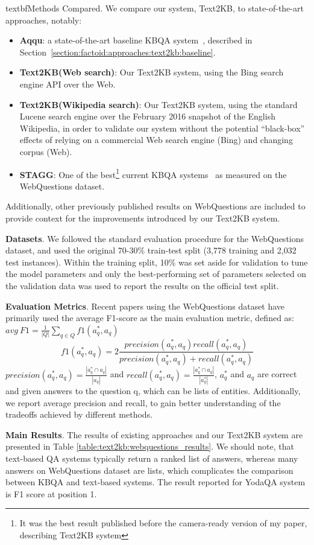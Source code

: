 textbf{Methods Compared}.
We compare our system, Text2KB, to state-of-the-art approaches, notably:
\begin{itemize}
\item{\textbf{Aqqu}}: a state-of-the-art baseline KBQA system~\cite{bastmore:cikm:2015:aquu}, described in Section~\ref{section:factoid:approaches:text2kb:baseline}.
\item{\textbf{Text2KB(Web search)}}: Our Text2KB system, using the Bing search engine API over the Web. 
\item{\textbf{Text2KB(Wikipedia search)}}: Our Text2KB system, using the standard Lucene search engine over the February 2016 snapshot of the English Wikipedia, in order to validate our system without the potential ``black-box'' effects of relying on a commercial Web search engine (Bing) and changing corpus (Web).
\item{\textbf{STAGG}}: One of the best\footnote{It was the best result published before the camera-ready version of my paper, describing Text2KB system} current KBQA systems~\cite{yih:ACL:2015:STAGG} as measured on the WebQuestions dataset.
\end{itemize}
Additionally, other previously published results on WebQuestions are included to provide context for the improvements introduced by our Text2KB system.

\textbf{Datasets}.
We followed the standard evaluation procedure for the WebQuestions dataset, and used the original 70-30\% train-test split (3,778 training and 2,032 test instances). Within the training split, 10\% was set aside for validation to tune the model parameters and only the best-performing set of parameters selected on the validation data was used to report the results on the official test split.

\textbf{Evaluation Metrics}. 
Recent papers using the WebQuestions dataset have primarily used the average F1-score as the main evaluation metric, defined as:
$avg\ F1 = \frac{1}{|Q|} \sum_{q \in Q} f1(a^*_q, a_q)$
$$f1(a^*_q, a_q) = 2\frac{precision(a^*_q,a_q) recall(a^*_q,a_q)}{precision(a^*_q,a_q) + recall(a^*_q,a_q)}$$
$precision(a^*_q, a_q)=\frac{|a^*_q \cap a_q|}{|a_q|}$ and $recall(a^*_q, a_q) = \frac{|a^*_q \cap a_q|}{|a^*_q|}$, $a^*_q$ and $a_q$ are correct and given answers to the question q, which can be lists of entities.
Additionally, we report average precision and recall, to gain better understanding of the tradeoffs achieved by different methods.

\textbf{Main Results}.
The results of existing approaches and our Text2KB system are presented in Table \ref{table:text2kb:webquestions_results}.
We should note, that text-based QA systems typically return a ranked list of answers, whereas many answers on WebQuestions dataset are lists, which complicates the comparison between KBQA and text-based systems.
The result reported for YodaQA system is F1 score at position 1.

